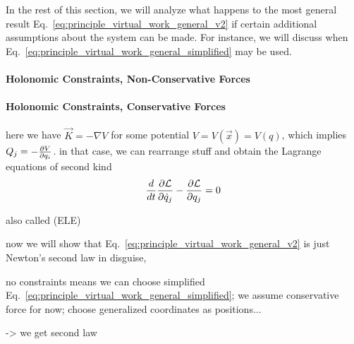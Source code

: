 \documentclass[../class_mech_main.tex]{subfiles}
\begin{document}



In the rest of this section, we will analyze what happens to the most general result Eq.~\eqref{eq:principle_virtual_work_general_v2} if certain additional assumptions about the system can be made. For instance, we will discuss when Eq.~\eqref{eq:principle_virtual_work_general_simplified} may be used.



			\paragraph{Holonomic Constraints, Non-Conservative Forces}





			\paragraph{Holonomic Constraints, Conservative Forces}
here we have $\vec{K} = - \nabla V$ for some potential $V = V(\vec{x}) = V(q)$, which implies $Q_j = - \pdv{V}{q_i}$. in that case, we can rearrange stuff and obtain the Lagrange equations of second kind
\begin{equation}
	\dv{t} \pdv{\mathcal{L}}{\dot{q}_j} - \pdv{\mathcal{L}}{q_j} = 0
\end{equation}

also called  (ELE)


now we will show that Eq.~\eqref{eq:principle_virtual_work_general_v2} is just Newton's second law in disguise, 
\begin{ex}
	no constraints means we can choose simplified Eq.~\eqref{eq:principle_virtual_work_general_simplified}; we assume conservative force for now; choose generalized coordinates as positions...


	-> we get second law
\end{ex}
\end{document}
